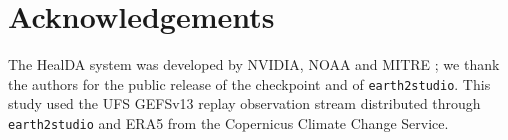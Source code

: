 \documentclass[twocolumn,11pt]{article}
\begin{document}
\section*{Acknowledgements}
The HealDA system was developed by NVIDIA, NOAA and MITRE
\citep{gupta2026healda}; we thank the authors for the public
release of the checkpoint and of \texttt{earth2studio}. This study
used the UFS GEFSv13 replay observation stream distributed through
\texttt{earth2studio} and ERA5 from the Copernicus Climate Change
Service.

\bigskip
\noindent{}
\end{document}
